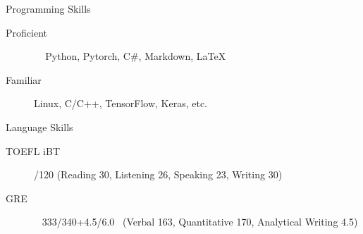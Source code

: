 \documentclass{resume} %
\begin{document}
\begin{rSection}{Programming Skills}

\begin{description}
    \item[Proficient] \quad\quad\quad\quad\,\,\,\,\, Python, Pytorch, C\#, Markdown, \LaTeX
    \item[Familiar] \quad\quad\quad\quad\quad\quad Linux, C/C++, TensorFlow, Keras, etc.
    \newline
\end{description}

\end{rSection}

\begin{rSection}{Language Skills}

\begin{description}
    \item[TOEFL iBT] /120 \quad (Reading 30, Listening 26, Speaking 23, Writing 30)
    \item[GRE] \quad\quad\quad\quad\,\,\, 333/340+4.5/6.0 \, (Verbal 163, Quantitative 170, Analytical Writing 4.5)
\end{description}

\end{rSection}
\end{document}
